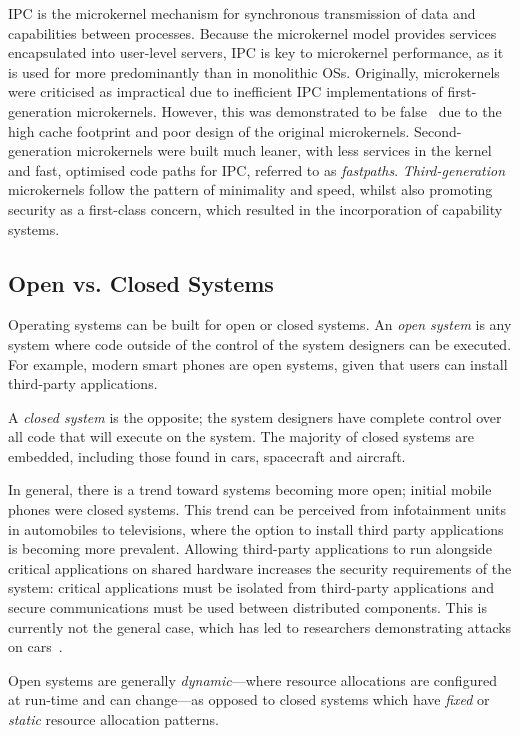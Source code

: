 \gls{IPC} is the microkernel mechanism for synchronous transmission of data and capabilities between
processes. Because the microkernel model provides services encapsulated into user-level servers,
\gls{IPC} is key to microkernel performance, as it is used for more predominantly than in monolithic
\glspl{OS}. Originally, microkernels were criticised as impractical due to inefficient IPC
implementations of first-generation microkernels. However, this was demonstrated to be
false~\citep{Hartig_HLSW_97} due to the high cache footprint and poor design of the original
microkernels. Second-generation microkernels were built much leaner, with less services in the
kernel and fast, optimised code paths for IPC, referred to as \emph{fastpaths}. 
\emph{Third-generation} microkernels follow the pattern of minimality and speed, whilst also
promoting security as a first-class concern, which resulted in the incorporation of capability
systems. 

\subsection{Open vs. Closed Systems}

Operating systems can be built for open or closed systems.  An \emph{open system} is any system
where code outside of the control of the system designers can be executed. For example, modern
smart phones are open systems, given that users can install third-party applications.

A \emph{closed system} is the opposite; the system designers have complete control over all code
that will execute on the system.  The majority of closed systems are embedded, including those found
in cars, spacecraft and aircraft.

In general, there is a trend toward systems becoming more open; initial mobile phones were closed
systems.  This trend can be perceived from infotainment units in automobiles to televisions, where
the option to install third party applications is becoming more prevalent.  Allowing third-party
applications to run alongside critical applications on shared hardware increases the security
requirements of the system: critical applications must be isolated from third-party applications and
secure communications must be used between distributed components.  This is currently not the
general case, which has led to researchers demonstrating attacks on
cars~\citep{Checkoway_MKASSKCRK_11}.

Open systems are generally \emph{dynamic}---where resource allocations are configured at run-time
and can change---as opposed to closed systems which have \emph{fixed} or \emph{static} resource
allocation patterns.

